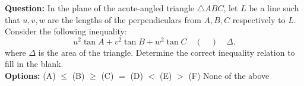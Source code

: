 \begin{examplebox}
\textbf{Question:} In the plane of the acute-angled triangle $\triangle ABC$, let $L$ be a line such that $u, v, w$ are the lengths of the perpendiculars from $A, B, C$ respectively to $L$. Consider the following inequality:
$$
u^2 \tan A + v^2 \tan B + w^2 \tan C \quad (\quad) \quad \Delta.
$$
where $\Delta$ is the area of the triangle. Determine the correct inequality relation to fill in the blank.\\

\textbf{Options:} (A) $\leq$ \quad(B) $\geq$ \quad (C) $=$  \quad (D) $<$ \quad  (E) $>$  \quad (F) None of the above

\end{examplebox}